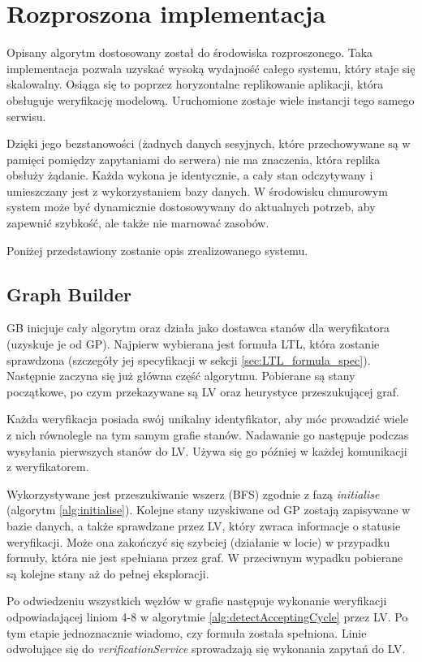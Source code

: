 \chapter{Rozproszona implementacja}

Opisany algorytm dostosowany został do środowiska rozproszonego.
Taka implementacja pozwala uzyskać wysoką wydajność całego systemu, który staje się skalowalny.
Osiąga się to poprzez horyzontalne replikowanie aplikacji, która obsługuje weryfikację modelową.
Uruchomione zostaje wiele instancji tego samego serwisu.

Dzięki jego bezstanowości (żadnych danych sesyjnych, które przechowywane są w pamięci pomiędzy zapytaniami do serwera) nie ma znaczenia, która replika obsłuży żądanie.
Każda wykona je identycznie, a cały stan odczytywany i umieszczany jest z wykorzystaniem bazy danych.
W środowisku chmurowym system może być dynamicznie dostosowywany do aktualnych potrzeb, aby zapewnić szybkość, ale także nie marnować zasobów.

Poniżej przedstawiony zostanie opis zrealizowanego systemu.


\section{Graph Builder}

GB inicjuje cały algorytm oraz działa jako dostawca stanów dla weryfikatora (uzyskuje je od GP).
Najpierw wybierana jest formuła LTL, która zostanie sprawdzona (szczegóły jej specyfikacji w sekcji \ref{sec:LTL_formula_spec}).
Następnie zaczyna się już główna część algorytmu.
Pobierane są stany początkowe, po czym przekazywane są LV oraz heurystyce przeszukującej graf.

Każda weryfikacja posiada swój unikalny identyfikator, aby móc prowadzić wiele z nich równolegle na tym samym grafie stanów.
Nadawanie go następuje podczas wysyłania pierwszych stanów do LV.
Używa się go później w każdej komunikacji z weryfikatorem.

Wykorzystywane jest przeszukiwanie wszerz (BFS) zgodnie z fazą \textit{initialise} (algorytm \ref{alg:initialise}).
Kolejne stany uzyskiwane od GP zostają zapisywane w bazie danych, a także sprawdzane przez LV, który zwraca informacje o statusie weryfikacji.
Może ona zakończyć się szybciej (działanie w locie) w przypadku formuły, która nie jest spełniana przez graf.
W przeciwnym wypadku pobierane są kolejne stany aż do pełnej eksploracji.

Po odwiedzeniu wszystkich węzłów w grafie następuje wykonanie weryfikacji odpowiadającej liniom 4-8 w algorytmie \ref{alg:detectAcceptingCycle} przez LV.
Po tym etapie jednoznacznie wiadomo, czy formuła została spełniona.
Linie odwołujące się do \textit{verificationService} sprowadzają się wykonania zapytań do LV.

